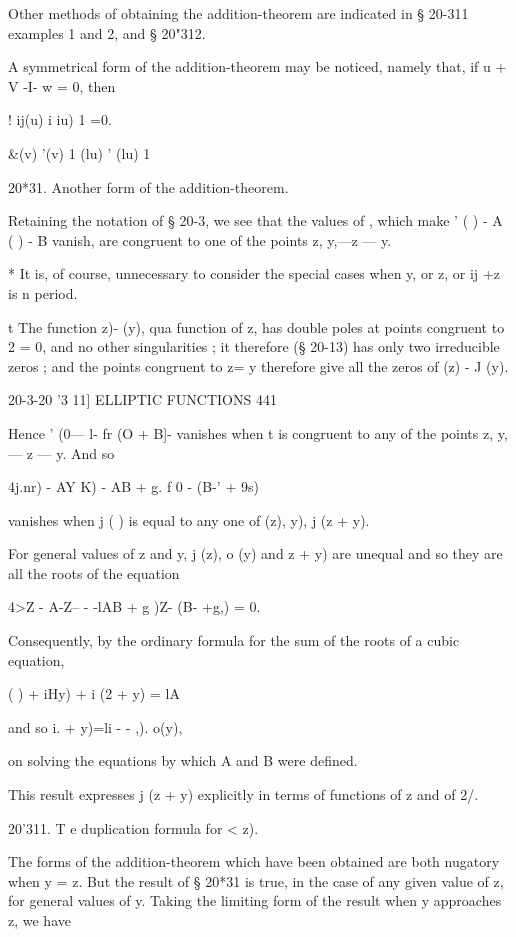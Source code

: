 {Other methods of obtaining the addition-theorem are indicated in § 20-311 
examples 1 and 2, and § 20"312. 

A symmetrical form of the addition-theorem may be noticed, namely 
that, if u + V -I- w = 0, then 

! ij(u) i iu) 1 =0. 

\&(v)  '(v) 1 
  (lu)  ' (lu) 1 

20*31. Another form of the addition-theorem. 

Retaining the notation of § 20-3, we see that the values of  , which make 
 ' ( ) - A  ( ) - B vanish, are congruent to one of the points z, y,—z — y. 

* It is, of course, unnecessary to consider the special cases when y, or z, or ij +z is n period. 

t The function   z)- (y), qua function of z, has double poles at points congruent to 2 = 0, 
and no other singularities ; it therefore (§ 20-13) has only two irreducible zeros ; and the points 
congruent to z= y therefore give all the zeros of   (z) -  J (y). 



20-3-20 '3 11] ELLIPTIC FUNCTIONS 441 

Hence  ' (0— l- fr  (O + B]- vanishes when t is congruent to any of the 
points z, y, — z — y. And so 

4j.nr) - AY K) -   AB + g.  f  0 - (B-' + 9s) 

vanishes when  j ( ) is equal to any one of   (z),    y),  j (z + y). 

For general values of z and y,  j (z),  o (y) and   z + y) are unequal and 
so they are all the roots of the equation 

4>Z  - A-Z-- -  -lAB + g )Z- (B- +g,) = 0. 

Consequently, by the ordinary formula for the sum of the roots of a cubic 
equation, 

 ( ) + iHy) + i (2 + y) = lA%

and so  i. + y)=li -  - ,). o(y), 

on solving the equations by which A and B were defined. 

This result expresses  j (z + y) explicitly in terms of functions of z and 
of 2/. 

20'311. T  e duplication formula for <  z). 

The forms of the addition-theorem which have been obtained are both 
nugatory when y = z. But the result of § 20*31 is true, in the case of any 
given value of z, for general values of y. Taking the limiting form of the 
result when y approaches z, we have 

}
